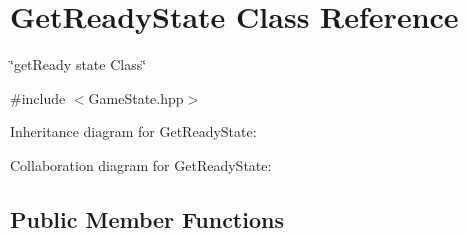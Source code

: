 \hypertarget{classGetReadyState}{}\section{Get\+Ready\+State Class Reference}
\label{classGetReadyState}


\char`\"{}get\+Ready state Class\char`\"{}  




{\ttfamily \#include $<$Game\+State.\+hpp$>$}



Inheritance diagram for Get\+Ready\+State\+:


Collaboration diagram for Get\+Ready\+State\+:
\subsection*{Public Member Functions}

